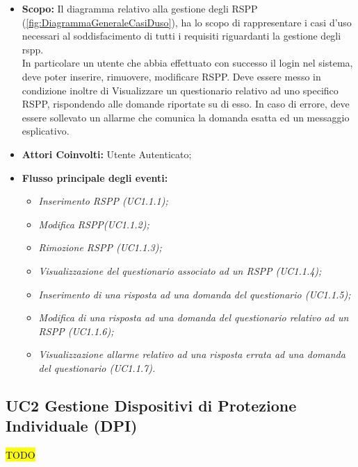 		\begin{itemize}
			\item \textbf{Scopo:} Il diagramma relativo alla gestione degli RSPP (\autoref{fig:DiagrammaGeneraleCasiDuso}), ha lo scopo di rappresentare i casi d'uso necessari al soddisfacimento di tutti i requisiti riguardanti la gestione degli rspp. \\
			In particolare un utente che abbia effettuato con successo il login nel sistema, deve poter inserire, rimuovere, modificare  RSPP. Deve essere messo in condizione inoltre di Visualizzare un questionario relativo ad uno specifico RSPP, rispondendo alle domande riportate su di esso. In caso di errore, deve essere sollevato un allarme che comunica la domanda esatta ed un messaggio esplicativo.
			\item \textbf{Attori Coinvolti:} Utente Autenticato;
			\item \textbf{Flusso principale degli eventi:} 
			\begin{itemize}
				\item \textit{Inserimento RSPP (UC1.1.1);}
				\item \textit{Modifica RSPP(UC1.1.2);}
				\item \textit{Rimozione RSPP (UC1.1.3);}
				\item \textit{Visualizzazione del questionario associato ad un RSPP (UC1.1.4);}
				\item \textit{Inserimento di una risposta ad una domanda del questionario (UC1.1.5);}
				\item \textit{Modifica di una risposta ad una domanda del questionario relativo ad un RSPP (UC1.1.6);}
				\item \textit{ Visualizzazione allarme relativo ad una risposta errata ad una domanda del questionario (UC1.1.7).}
			\end{itemize}
		\end{itemize}
			
	\subsection{UC2 Gestione Dispositivi di Protezione Individuale (DPI)}
		\label{section:UC2}
		\hl{TODO}
